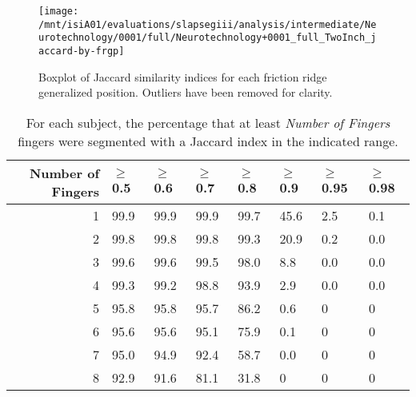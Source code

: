 \documentclass[]{article}
\begin{document}
\begin{figure}

{\centering \texttt{[image: /mnt/isiA01/evaluations/slapsegiii/analysis/intermediate/Neurotechnology/0001/full/Neurotechnology+0001\_full\_TwoInch\_jaccard-by-frgp]} 

}

\caption{Boxplot of Jaccard similarity indices for each friction ridge generalized position. Outliers have been removed for clarity.}\label{fig:twoinch-jaccard-frgp}
\end{figure}

\begin{table}[!h]

\caption{\label{tab:twoinch-per-subject-jaccard}For each subject, the percentage that at least \textit{Number of Fingers} fingers were segmented with a Jaccard index in the indicated range.}
\centering
\begin{tabular}{rlllllll}
\toprule
Number of Fingers & $\ge$0.5 & $\ge$0.6 & $\ge$0.7 & $\ge$0.8 & $\ge$0.9 & $\ge$0.95 & $\ge$0.98\\
\midrule
\rowcolor{gray!6}  1 & 99.9 & 99.9 & 99.9 & 99.7 & 45.6 & 2.5 & 0.1\\
2 & 99.8 & 99.8 & 99.8 & 99.3 & 20.9 & 0.2 & 0.0\\
\rowcolor{gray!6}  3 & 99.6 & 99.6 & 99.5 & 98.0 & 8.8 & 0.0 & 0.0\\
4 & 99.3 & 99.2 & 98.8 & 93.9 & 2.9 & 0.0 & 0.0\\
\rowcolor{gray!6}  5 & 95.8 & 95.8 & 95.7 & 86.2 & 0.6 & 0 & 0\\
6 & 95.6 & 95.6 & 95.1 & 75.9 & 0.1 & 0 & 0\\
\rowcolor{gray!6}  7 & 95.0 & 94.9 & 92.4 & 58.7 & 0.0 & 0 & 0\\
8 & 92.9 & 91.6 & 81.1 & 31.8 & 0 & 0 & 0\\
\bottomrule
\end{tabular}
\end{table}
\end{document}
